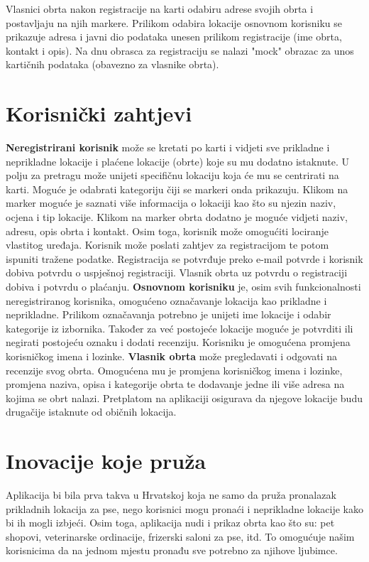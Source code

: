 	Vlasnici obrta nakon registracije na karti odabiru adrese svojih obrta i postavljaju na njih markere. Prilikom odabira lokacije osnovnom korisniku se prikazuje adresa i javni dio podataka unesen prilikom registracije (ime obrta, kontakt i opis). Na dnu obrasca za registraciju se nalazi "mock" obrazac za unos kartičnih podataka (obavezno za vlasnike obrta).
	\newline
    
    \section{Korisnički zahtjevi}
    \hfill\break
    \textbf{Neregistrirani korisnik} može se kretati po karti i vidjeti sve prikladne i neprikladne lokacije i plaćene lokacije (obrte) koje su mu dodatno istaknute. U polju za pretragu može unijeti specifičnu lokaciju koja će mu se centrirati na karti. Moguće je odabrati kategoriju čiji se markeri onda prikazuju. Klikom na marker moguće je saznati više informacija o lokaciji kao što su njezin naziv, ocjena i tip lokacije. Klikom na marker obrta dodatno je moguće vidjeti naziv, adresu, opis obrta i kontakt. Osim toga, korisnik može omogućiti lociranje vlastitog uređaja. 
     \newline
    Korisnik može poslati zahtjev za registracijom te potom ispuniti tražene podatke. Registracija se potvrđuje preko e-mail potvrde i korisnik dobiva potvrdu o uspješnoj registraciji. Vlasnik obrta uz potvrdu o registraciji dobiva i potvrdu o plaćanju. 
    \newline
    \hfill\break
    \textbf{Osnovnom korisniku} je, osim svih funkcionalnosti neregistriranog korisnika, omogućeno označavanje lokacija kao prikladne i neprikladne. Prilikom označavanja potrebno je unijeti ime lokacije i odabir kategorije iz izbornika. Također za već postojeće lokacije moguće je potvrditi ili negirati postojeću oznaku i dodati recenziju. Korisniku je omogućena promjena korisničkog imena i lozinke. 
    \newline
    \hfill\break
    \textbf{Vlasnik obrta} može pregledavati i odgovati na recenzije svog obrta. Omogućena mu je promjena korisničkog imena i lozinke, promjena naziva, opisa i kategorije obrta te dodavanje jedne ili više adresa na kojima se obrt nalazi. Pretplatom na aplikaciji osigurava da njegove lokacije budu drugačije istaknute od običnih lokacija.
    
    \section{Inovacije koje pruža}
    Aplikacija bi bila prva takva u Hrvatskoj koja ne samo da pruža pronalazak prikladnih lokacija za pse, nego korisnici mogu pronaći i neprikladne lokacije kako bi ih mogli izbjeći. Osim toga, aplikacija nudi i prikaz obrta kao što su: pet shopovi, veterinarske ordinacije, frizerski saloni za pse, itd. To omogućuje našim korisnicima da na jednom mjestu pronađu sve potrebno za njihove ljubimce.
    
